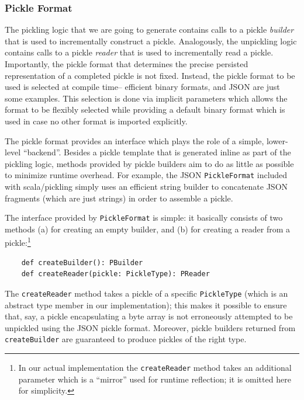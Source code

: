 \documentclass[10pt]{sigplanconf}
\theoremstyle{definition}
\theoremstyle{definition}
\newcommand{\term}[1]{\mbox{\texttt{#1}}}
\begin{document}
\subsubsection{Pickle Format}
\label{sec:pickleformat}

The pickling logic that we are going to generate contains calls to a pickle
{\em builder} that is used to incrementally construct a pickle. Analogously,
the unpickling logic contains calls to a pickle {\em reader} that is used to
incrementally read a pickle. Importantly, the pickle format that determines
the precise persisted representation of a completed pickle is not fixed.
Instead, the pickle format to be used is selected at compile time-- efficient
binary formats, and JSON are just some examples. This selection is done via
implicit parameters which allows the format to be flexibly selected while
providing a default binary format which is used in case no other format is
imported explicitly.

The pickle format provides an interface which plays the role of a simple,
lower-level ``backend''. Besides a pickle template that is generated inline as
part of the pickling logic, methods provided by pickle builders aim to do as
little as possible to minimize runtime overhead. For example,  the JSON
\term{PickleFormat} included with scala/pickling simply uses an
efficient string builder to concatenate JSON fragments (which are just
strings) in order to assemble a pickle.

The interface provided by \term{PickleFormat} is simple: it basically consists
of two methods (a) for creating an empty builder, and (b) for creating a
reader from a pickle:\footnote{In our actual implementation the
\term{createReader} method takes an additional parameter which is a ``mirror''
used for runtime reflection; it is omitted here for simplicity.}

\begin{lstlisting}
    def createBuilder(): PBuilder
    def createReader(pickle: PickleType): PReader
\end{lstlisting}

The \term{createReader} method takes a pickle of a specific \term{PickleType}
(which is an abstract type member in our implementation); this makes it
possible to ensure that, say, a pickle encapsulating a byte array is not
erroneously attempted to be unpickled using the JSON pickle format. Moreover,
pickle builders returned from \verb|createBuilder| are guaranteed to produce
pickles of the right type.
\end{document}
